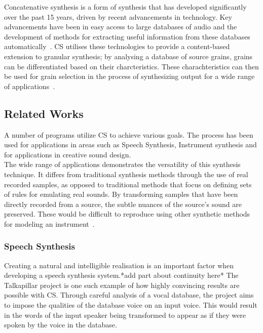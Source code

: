 \documentclass{scrartcl}
\begin{document}
    Concatenative synthesis is a form of synthesis that has developed
    significantly over the past 15 years, driven by recent advancements in
    technology. Key advancements have been in easy access to large databases of
    audio and the development of methods for extracting useful information from
    these databases automatically~\parencite[p.1]{Schwarz2006}.  CS utilises
    these technologies to provide a content-based extension to granular
    synthesis; by analysing a database of source grains, grains can be
    differentiated based on their charcteristics.  These charachteristics can
    then be used for grain selection in the process of synthesizing output for
    a wide range of applications~\parencite[p.102]{Schwarz2007}.

    \subsection*{Related Works}
    A number of programs utilize CS to achieve various goals. The process has
    been used for applications in areas such as Speech Synthesis, Instrument
    synthesis and for applications in creative sound design.\\
    The wide range of applications demonstrates the versatility of this
    synthesis technique. It differs from traditional synthesis methods through
    the use of real recorded samples, as opposed to traditional methods that
    focus on defining sets of rules for emulating real sounds. By transforming
    samples that have been directly recorded from a source, the subtle nuances
    of the source's sound are preserved. These would be difficult to reproduce
    using other synthetic methods for modeling an
    instrument~\parencite[p.24]{Maestre2009a}.

    \subsubsection*{Speech Synthesis}
    Creating a natural and intelligible realisation is an important factor when
    developing a speech synthesis system.*add part about continuity here* The
    Talkapillar project is one such example of how highly convincing results
    are possible with CS. Through careful analysis of a vocal database, the
    project aims to impose the qualities of the database voice on an input
    voice. This would result in the words of the input speaker being
    transformed to appear as if they were spoken by the voice in the
    database.~\parencite{Hueber}
    
\end{document}
